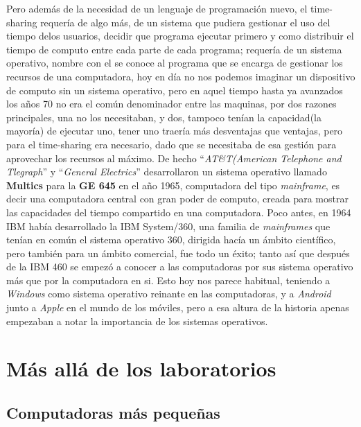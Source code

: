 \documentclass[letterpaper,12pt,oneside]{book}
\begin{document}
		Pero además de la necesidad de un lenguaje de programación nuevo, el time-sharing requería de algo más, de un sistema que pudiera gestionar el uso del 
		tiempo delos usuarios, decidir que programa ejecutar primero y como distribuir el tiempo de computo entre cada parte de cada programa; requería
		de un sistema operativo, nombre con el se conoce al programa que se encarga de gestionar los recursos de una computadora, hoy en día no nos
		podemos imaginar un dispositivo de computo sin un sistema operativo, pero en aquel tiempo hasta ya avanzados los años 70 no era el común
		denominador entre las maquinas, por dos razones principales, una no los necesitaban, y dos, tampoco tenían la capacidad(la mayoría) de ejecutar uno,
		tener uno traería más desventajas que ventajas, pero para el time-sharing era necesario, dado que se necesitaba de esa gestión para aprovechar los
		recursos al máximo. De hecho ``\textit{AT\&T(American Telephone and Tlegraph}'' y ``\textit{General Electrics}'' desarrollaron un sistema operativo llamado
		\textbf{Multics} para la \textbf{GE 645} en el año 1965, computadora del tipo \textit{mainframe}, es decir una computadora central con gran
		poder de computo, creada para mostrar las capacidades del tiempo compartido en una computadora. Poco antes, en 1964 IBM había desarrollado la
		IBM System/360, una familia de \textit{mainframes} que tenían en común el sistema operativo 360, dirigida hacía un ámbito científico, pero
		también para un ámbito comercial, fue todo un éxito; tanto así que después de la IBM 460 se empezó a conocer a las computadoras por sus sistema operativo
		más que por la computadora en si. Esto hoy nos parece habitual, teniendo a \textit{Windows} como sistema operativo reinante en las computadoras, y a \textit{Android} 
		junto a \textit{Apple} en el mundo de los móviles, pero a esa altura de la historia apenas empezaban a notar la importancia de los sistemas operativos.
				
	\section{Más allá de los laboratorios}
		
		\subsection{Computadoras más pequeñas}
		
\end{document}
